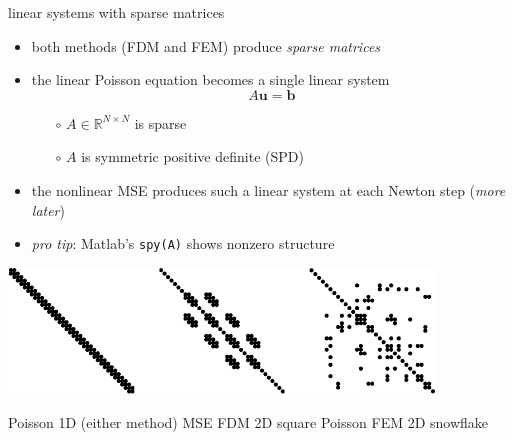 \documentclass[hide notes,intlimits,usenames,dvipsnames]{beamer}
\newcommand{\RR}{\mathbb{R}}
\newcommand{\bb}{\mathbf{b}}
\newcommand{\bu}{\mathbf{u}}
\begin{document}
\begin{frame}{linear systems with sparse matrices}
\begin{itemize}
\item both methods (FDM and FEM) produce \emph{sparse matrices}
\item the linear Poisson equation becomes a single linear system
    $$A \bu = \bb$$
    \vspace{-4mm}
	\begin{itemize}
	\item[$\circ$] $A\in\RR^{N\times N}$ is sparse
	\item[$\circ$] $A$ is symmetric positive definite (SPD)
	\end{itemize}
\item the nonlinear MSE produces such a linear system at each Newton step (\emph{more later})
\item \emph{pro tip}: Matlab's \texttt{spy(A)} shows nonzero structure
\end{itemize}

\bigskip
\begin{center}
\includegraphics[width=0.85\textwidth]{figs/spythree}

\scriptsize
Poisson 1D (either method) \quad MSE FDM 2D square \qquad Poisson FEM 2D snowflake

\end{center}
\end{frame}
\end{document}
